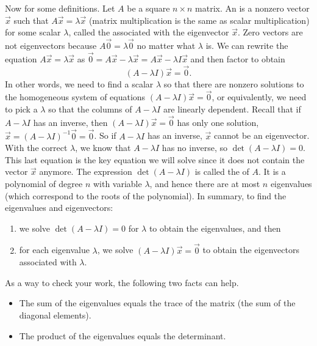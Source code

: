 {Now for some definitions. 
Let $A$ be a square $n\times n$ matrix. 
An  is a nonzero vector $\vec x$ such that $A\vec x =\lambda \vec x$ (matrix multiplication is the same as scalar multiplication) for some scalar {$\lambda$}, called the  associated with the eigenvector $\vec x$.
Zero vectors are not eigenvectors because $A\vec 0=\lambda \vec 0$ no matter what $\lambda$ is.
We can rewrite the equation $A\vec x = \lambda \vec x$ as $\vec 0 = A\vec x-\lambda \vec x = A\vec x-\lambda I \vec x$ and then factor to obtain $$(A-\lambda I)\vec x=\vec 0.$$ 
In other words, we need to find a scalar $\lambda$ so that there are nonzero solutions to the homogeneous system of equations $(A-\lambda I)\vec x=\vec 0$, or equivalently, we need to pick a $\lambda$ so that the columns of $A-\lambda I$ are linearly dependent. 
Recall that if $A-\lambda I$ has an inverse, then $(A-\lambda I)\vec x=\vec 0$ has only one solution, $\vec x=(A-\lambda I)^{-1}\vec 0=\vec 0$.  So if $A-\lambda I$ has an inverse, $\vec x$ cannot be an eigenvector.  With the correct $\lambda$, we know that $A-\lambda I$ has no inverse, so $\det(A-\lambda I)=0$. 
This last equation is the key equation we will solve since it does not contain the vector $\vec x$ anymore. 
The expression {$\det(A-\lambda I)$} is called the  of {$A$}.
It is a polynomial of degree {$n$} with variable $\lambda$, and hence there are at most {$n$} eigenvalues (which correspond to the roots of the polynomial). 
In summary, to find the eigenvalues and eigenvectors:
\begin{enumerate}
	\item we solve $\det(A-\lambda I) = 0$ for $\lambda$ to obtain the eigenvalues, and then
	\item for each eigenvalue $\lambda$, we solve $(A-\lambda I)\vec x=\vec 0$ to obtain the eigenvectors associated with $\lambda$.
\end{enumerate}
As a way to check your work, the following two facts can help.
\begin{itemize}
	\item {}The sum of the eigenvalues equals the trace of the matrix (the sum of the diagonal elements).
	\item The product of the eigenvalues equals the determinant.
\end{itemize}

}
